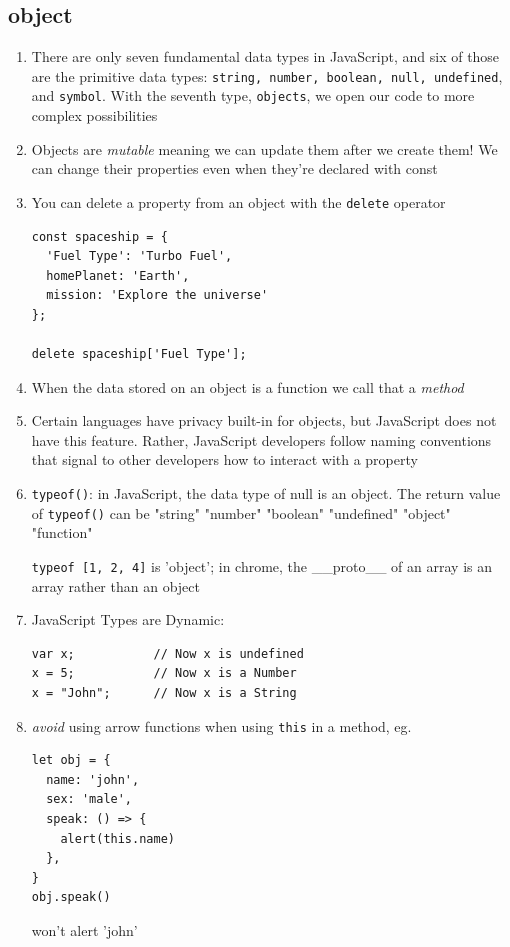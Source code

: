 \documentclass[a4paper, 12pt]{article}
\begin{document}
\subsection{object}
\begin{enumerate}
\item There are only seven fundamental data types in JavaScript, and six of those are the primitive data types: \verb|string, number, boolean, null, undefined|, and \verb|symbol|. With the seventh type, \verb|objects|, we open our code to more complex possibilities

\item Objects are \textit{mutable} meaning we can update them after we create them! We can change their properties even when they're declared with const

\item You can delete a property from an object with the \verb|delete| operator
\begin{verbatim}
const spaceship = {
  'Fuel Type': 'Turbo Fuel',
  homePlanet: 'Earth',
  mission: 'Explore the universe' 
};

delete spaceship['Fuel Type'];
\end{verbatim}

\item When the data stored on an object is a function we call that a \textit{method}

\item Certain languages have privacy built-in for objects, but JavaScript does not have this feature. Rather, JavaScript developers follow naming conventions that signal to other developers how to interact with a property

\item \verb|typeof()|: in JavaScript, the data type of null is an object. The return value of \verb|typeof()| can be "string" "number" "boolean" "undefined" "object" "function"

\verb|typeof [1, 2, 4]| is 'object'; in chrome, the \_\_proto\_\_ of an array is an array rather than an object

\item JavaScript Types are Dynamic:
\begin{verbatim}
var x;           // Now x is undefined
x = 5;           // Now x is a Number
x = "John";      // Now x is a String
\end{verbatim}

\item \textit{avoid} using arrow functions when using \verb|this| in a method, eg.
\begin{verbatim}
let obj = {
  name: 'john',
  sex: 'male',
  speak: () => {
    alert(this.name)
  },
}
obj.speak()
\end{verbatim}
won't alert 'john'


\end{enumerate}
\end{document}
